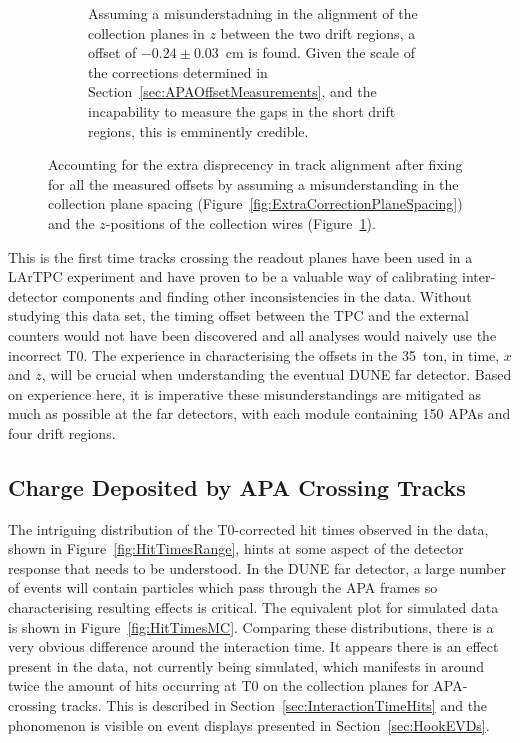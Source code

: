\begin{figure}
\begin{subfigure}[t]{0.48\linewidth}
    \caption{Assuming a misunderstadning in the alignment of the collection planes in $z$ between the two drift regions, a offset of $-0.24\pm0.03$~cm is found.  Given the scale of the corrections determined in Section~\ref{sec:APAOffsetMeasurements}, and the incapability to measure the gaps in the short drift regions, this is emminently credible.}
    \label{fig:ExtraCorrectionWire}
  \end{subfigure}
  \caption[Accounting for the extra disprecency in track alignment after fixing for all the measured offsets by assuming a misunderstanding in the collection plane spacing and the $z$-positions of the collection wires.]{Accounting for the extra disprecency in track alignment after fixing for all the measured offsets by assuming a misunderstanding in the collection plane spacing (Figure~\ref{fig:ExtraCorrectionPlaneSpacing}) and the $z$-positions of the collection wires (Figure~\ref{fig:ExtraCorrectionWire}).}
  \label{fig:ExtraCorrections}
\end{figure}

This is the first time tracks crossing the readout planes have been used in a LArTPC experiment and have proven to be a valuable way of calibrating inter-detector components and finding other inconsistencies in the data.  Without studying this data set, the timing offset between the TPC and the external counters would not have been discovered and all analyses would naively use the incorrect T0.  The experience in characterising the offsets in the 35~ton, in time, $x$ and $z$, will be crucial when understanding the eventual DUNE far detector.  Based on experience here, it is imperative these misunderstandings are mitigated as much as possible at the far detectors, with each module containing 150 APAs and four drift regions.

\subsection{Charge Deposited by APA Crossing Tracks}\label{sec:APACrossingCharge}

The intriguing distribution of the T0-corrected hit times observed in the data, shown in Figure~\ref{fig:HitTimesRange}, hints at some aspect of the detector response that needs to be understood.  In the DUNE far detector, a large number of events will contain particles which pass through the APA frames so characterising resulting effects is critical.  The equivalent plot for simulated data is shown in Figure~\ref{fig:HitTimesMC}.  Comparing these distributions, there is a very obvious difference around the interaction time. It appears there is an effect present in the data, not currently being simulated, which manifests in around twice the amount of hits occurring at T0 on the collection planes for APA-crossing tracks.  This is described in Section~\ref{sec:InteractionTimeHits} and the phonomenon is visible on event displays presented in Section~\ref{sec:HookEVDs}.

